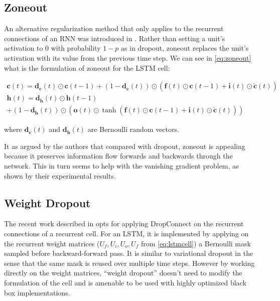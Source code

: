 \subsection{Zoneout}

An alternative regularization method that only applies to the recurrent connections of an RNN was introduced in \cite{krueger2016zoneout}. Rather than setting a unit's activation to 0 with probability $1-p$ as in dropout, zoneout replaces the unit's activation with its value from the previous time step. We can see in \autoref{eq:zoneout} what is the formulation of zoneout for the LSTM cell:

\begin{equation} \label{eq:zoneout}
	\begin{gathered}
		\mathbf{c}(t) = \mathbf{d_c}(t)\odot\mathbf{c}(t-1) + (1-\mathbf{d_c}(t))\odot(\mathbf{f}(t) \odot \mathbf{c}(t-1) + \mathbf{i}(t) \odot \mathbf{\tilde{c}}(t)) \\
		\mathbf{h}(t) = \mathbf{d_h}(t)\odot\mathbf{h}(t-1) \\ 
		+ (1-\mathbf{d_h}(t))\odot (\mathbf{o}(t) \odot \tanh(\mathbf{f}(t) \odot \mathbf{c}(t-1) + \mathbf{i}(t) \odot \mathbf{\tilde{c}}(t)))
	\end{gathered}
\end{equation}

where $\mathbf{d_c}(t)$ and $\mathbf{d_h}(t)$ are Bernoulli random vectors.

It as argued by the authors that compared with dropout, zoneout is appealing because it preserves information flow forwards and backwards through the network. This in turn seems to help with the vanishing gradient problem, as shown by their experimental results.

\subsection{Weight Dropout}

The recent work described in \cite{merity2017regularizing} opts for applying DropConnect \cite{wan2013regularization} on the recurrent connections of a recurrent cell. For an LSTM, it is implemented by applying on the recurrent weight matrices ($U_f,U_i,U_o,U_f$ from \autoref{eq:lstmcell}) a Bernoulli mask  sampled before backward-forward pass. It is similar to variational dropout in the sense that the same mask is reused over multiple time steps. However by working directly on the weight matrices, ``weight dropout'' doesn't need to modify the formulation of the cell and is amenable to be used with highly optimized black box implementations.